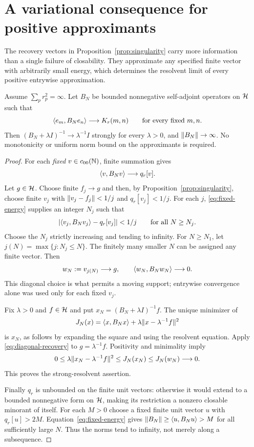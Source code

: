 \section{A variational consequence for positive approximants}
\label{sec:variational}

The recovery vectors in Proposition~\ref{prop:singularity} carry more
information than a single failure of closability. They approximate any
specified finite vector with arbitrarily small energy, which determines
the resolvent limit of every positive entrywise approximation.

\begin{proposition}
\label{prop:collapse}
Assume $\sum_p r_p^2=\infty$. Let $B_N$ be bounded nonnegative
self-adjoint operators on $\mathcal{H}$ such that
\[
 \langle e_m,B_Ne_n\rangle\longrightarrow K_r(m,n)
 \qquad\text{for every fixed }m,n.
\]
Then $(B_N+\lambda I)^{-1}\to\lambda^{-1}I$ strongly for every
$\lambda>0$, and $\lVert B_N\rVert\to\infty$.
No monotonicity or uniform norm bound on the approximants is required.
\end{proposition}
\begin{proof}
For each \emph{fixed} $v\in c_{00}(\mathbb{N})$, finite summation gives
\begin{equation}
 \langle v,B_Nv\rangle\longrightarrow q_r[v].
 \label{eq:fixed-energy}
\end{equation}
Let $g\in\mathcal{H}$. Choose finite $f_j\to g$ and then, by
Proposition~\ref{prop:singularity}, choose finite $v_j$ with
$\lVert v_j-f_j\rVert<1/j$ and $q_r[v_j]<1/j$.
For each $j$, \eqref{eq:fixed-energy} supplies an integer $N_j$
such that
\[
 \lvert \langle v_j,B_Nv_j\rangle-q_r[v_j]\rvert<1/j
 \qquad\text{for all }N\ge N_j.
\]
Choose the $N_j$ strictly increasing and tending to infinity.
For $N\ge N_1$, let $j(N)=\max\{j:N_j\le N\}$.
The finitely many smaller $N$ can be assigned any finite vector.
Then
\begin{equation}
 w_N:=v_{j(N)}\longrightarrow g,\qquad
 \langle w_N,B_Nw_N\rangle\longrightarrow0.
 \label{eq:diagonal-recovery}
\end{equation}
This diagonal choice is what permits a moving support; entrywise
convergence alone was used only for each fixed $v_j$.

Fix $\lambda>0$ and $f\in\mathcal{H}$ and put
$x_N=(B_N+\lambda I)^{-1}f$.
The unique minimizer of
\[
 J_N(x)=\langle x,B_Nx\rangle
       +\lambda\lVert x-\lambda^{-1}f\rVert^2
\]
is $x_N$, as follows by expanding the square and using the resolvent
equation. Apply \eqref{eq:diagonal-recovery} to $g=\lambda^{-1}f$.
Positivity and minimality imply
\[
 0\le\lambda\lVert x_N-\lambda^{-1}f\rVert^2
 \le J_N(x_N)\le J_N(w_N)\longrightarrow0.
\]
This proves the strong-resolvent assertion.

Finally $q_r$ is unbounded on the finite unit vectors: otherwise it
would extend to a bounded nonnegative form on $\mathcal{H}$, making its
restriction a nonzero closable minorant of itself.
For each $M>0$ choose a fixed finite unit vector $u$ with $q_r[u]>2M$.
Equation~\eqref{eq:fixed-energy} gives
$\lVert B_N\rVert\ge\langle u,B_Nu\rangle>M$ for all sufficiently large $N$.
Thus the norms tend to infinity, not merely along a subsequence.
\end{proof}

